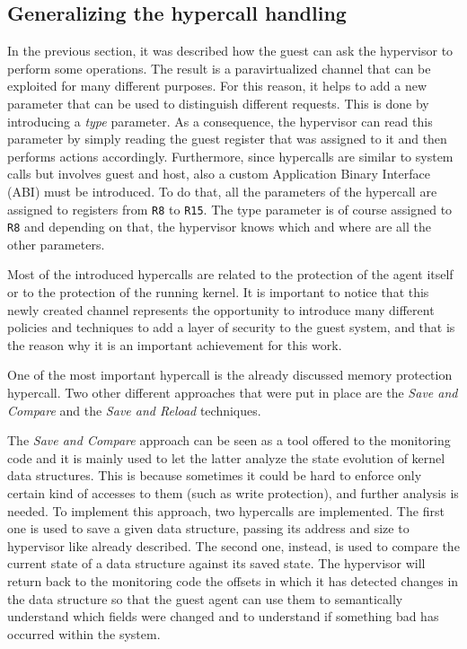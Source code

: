 \subsection{Generalizing the hypercall handling}
In the previous section, it was described how the guest can ask the hypervisor to perform some operations. The result is a paravirtualized channel that can be exploited for many different purposes. For this reason, it helps to add a new parameter that can be used to distinguish different requests. This is done by introducing a \emph{type} parameter. As a consequence, the hypervisor can read this parameter by simply reading the guest register that was assigned to it and then performs actions accordingly. Furthermore, since hypercalls are similar to system calls but involves guest and host, also a custom Application Binary Interface (ABI) must be introduced. To do that, all the parameters of the hypercall are assigned to registers from \texttt{R8} to \texttt{R15}. The type parameter is of course assigned to \texttt{R8} and depending on that, the hypervisor knows which and where are all the other parameters.
\par 
Most of the introduced hypercalls are related to the protection of the agent itself or to the protection of the running kernel. It is important to notice that this newly created channel represents the opportunity to introduce many different policies and techniques to add a layer of security to the guest system, and that is the reason why it is an important achievement for this work. 
\par 
One of the most important hypercall is the already discussed memory protection hypercall. Two other different approaches that were put in place are the \emph{Save and Compare} and the \emph{Save and Reload} techniques. 
\par %
The \emph{Save and Compare} approach can be seen as a tool offered to the monitoring code and it is mainly used to let the latter analyze the state evolution of kernel data structures. This is because sometimes it could be hard to enforce only certain kind of accesses to them (such as write protection), and further analysis is needed. To implement this approach, two hypercalls are implemented. The first one is used to save a given data structure, passing its address and size to hypervisor like already described. The second one, instead, is used to compare the current state of a data structure against its saved state. The hypervisor will return back to the monitoring code the offsets in which it has detected changes in the data structure so that the guest agent can use them to semantically understand which fields were changed and to understand if something bad has occurred within the system. 
